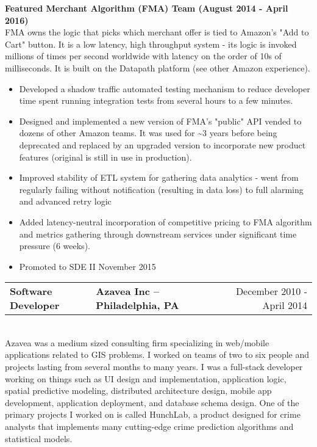 \documentclass{res}
\newlength{\vsep}
\begin{document}
\begin{resume}
   {\large \bf Featured Merchant Algorithm (FMA) Team (August 2014 - April 2016)}\\
   FMA owns the logic that picks which merchant offer is tied to Amazon's "Add to Cart" button. It is a low latency, high throughput system - its logic is invoked millions of times per second worldwide with latency on the order of 10s of milliseconds.  It is built on the Datapath platform (see other Amazon experience).
   \begin{itemize}
   \item Developed a shadow traffic automated testing mechanism to reduce developer time spent running integration tests from several hours to a few minutes.
   \item Designed and implemented a new version of FMA's "public" API vended to dozens of other Amazon teams.  It was used for \textasciitilde 3 years before being deprecated and replaced by an upgraded version to incorporate new product features (original is still in use in production).
   \item Improved stability of ETL system for gathering data analytics - went from regularly failing without notification (resulting in data loss) to full alarming and advanced retry logic
   \item Added latency-neutral incorporation of competitive pricing to FMA algorithm and metrics gathering through downstream services under significant time pressure (6 weeks).
   \item Promoted to SDE II November 2015
   \end{itemize}
   \vspace{\vsep}
   
   \begin{tabularx}{\textwidth}{@{}>{\bf}l>{\large\bf\centering\arraybackslash}Xr@{}}
   Software Developer & Azavea Inc -- Philadelphia, PA & December 2010 - April 2014\vspace{\vsep}\\
   \end{tabularx}\\
   Azavea was a medium sized consulting firm specializing in web/mobile applications related to GIS problems.  I worked on teams of two to six people and projects lasting from several months to many years.  I was a full-stack developer working on things such as UI design and implementation, application logic, spatial predictive modeling, distributed architecture design, mobile app development, application deployment, and database schema design.  One of the primary projects I worked on is called HunchLab, a product designed for crime analysts that implements many cutting-edge crime prediction algorithms and statistical models.\\


\end{resume}
\end{document}
